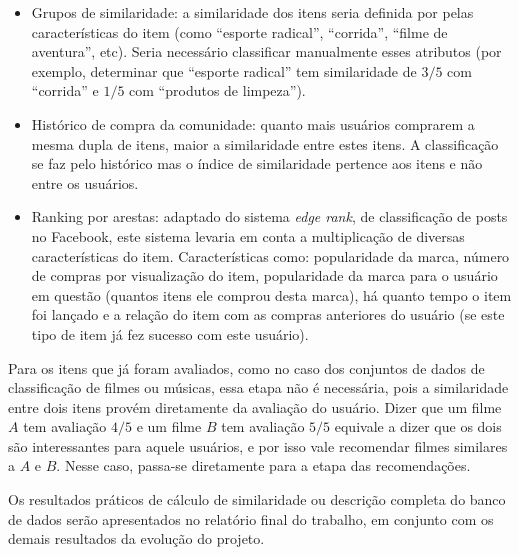 \begin{itemize} 
	\item Grupos de similaridade: a similaridade dos itens seria definida por pelas características do item (como ``esporte radical'', ``corrida'', ``filme de aventura'', etc). Seria necessário classificar manualmente esses atributos (por exemplo, determinar que ``esporte radical'' tem similaridade de $3/5$ com ``corrida'' e $1/5$ com ``produtos de limpeza'').
	\item Histórico de compra da comunidade: quanto mais usuários comprarem a mesma dupla de itens, maior a similaridade entre estes itens. A classificação se faz pelo histórico mas o índice de similaridade pertence aos itens e não entre os usuários.
	\item Ranking por arestas: adaptado do sistema \textit{edge rank}, de classificação de posts no Facebook, este sistema levaria em conta a multiplicação de diversas características do item. Características como: popularidade da marca, número de compras por visualização do item, popularidade da marca para o usuário em questão (quantos itens ele comprou desta marca), há quanto tempo o item foi lançado e a relação do item com as compras anteriores do usuário (se este tipo de item já fez sucesso com este usuário).
\end{itemize}

Para os itens que já foram avaliados, como no caso dos conjuntos de dados de classificação de filmes ou músicas, essa etapa não é necessária, pois a similaridade entre dois itens provém diretamente da avaliação do usuário. Dizer que um filme $A$ tem avaliação $4/5$ e um filme $B$ tem avaliação $5/5$ equivale a dizer que os dois são interessantes para aquele usuários, e por isso vale recomendar filmes similares a $A$ e $B$. Nesse caso, passa-se  diretamente para a etapa das recomendações.

Os resultados práticos de cálculo de similaridade ou descrição completa do banco de dados serão apresentados no relatório final do trabalho, em conjunto com os demais resultados da evolução do projeto. 
